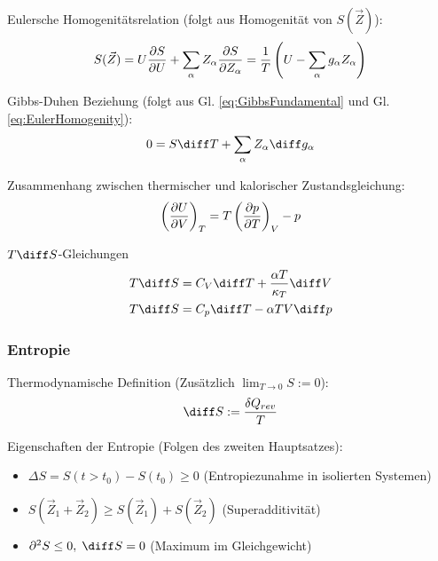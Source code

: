 \documentclass[11pt]{article}
\numberwithin{equation}{section}
\begin{document}
        Eulersche Homogenitätsrelation (folgt aus Homogenität von $S(\vec{Z})$):
        \begin{equation}
          \label{eq:EulerHomogenity}
          S(\vec{Z}) = U\frac{\partial S}{\partial U} + \sum_\alpha Z_\alpha\frac{\partial S}{\partial Z_\alpha}
          = \frac{1}{T} \left( U-\sum_\alpha g_\alpha Z_\alpha \right)
        \end{equation}

        Gibbs-Duhen Beziehung (folgt aus Gl. \ref{eq:GibbsFundamental} und Gl. \ref{eq:EulerHomogenity}):
        \begin{equation}
          0 = S \diff T + \sum_\alpha Z_\alpha \diff g_\alpha
        \end{equation}

        Zusammenhang zwischen thermischer und kalorischer Zustandsgleichung:
        \begin{equation}
          \left(\frac{\partial U}{\partial V}\right)_T = T\left(\frac{\partial p}{\partial T}\right)_V - p
        \end{equation}

        $T \diff S$-Gleichungen
        \begin{equation}
          \begin{aligned}
            T \diff S &= C_V \diff T + \frac{\alpha T}{\kappa_T} \diff V \\
            T \diff S &= C_p \diff T - \alpha T V \diff p
          \end{aligned}
        \end{equation}

      \subsubsection{Entropie}
        Thermodynamische Definition (Zusätzlich $\lim_{T\rightarrow 0} S := 0$):
        \begin{equation}
          \diff S := \frac{\delta Q_{rev}}{T}
        \end{equation}

        Eigenschaften der Entropie (Folgen des zweiten Hauptsatzes):
        \begin{itemize}\itemsep -0pt  %
          \item $\Delta S = S(t>t_0)-S(t_0) \ge 0$ \hfill{(Entropiezunahme in isolierten Systemen)}
          \item $S(\vec{Z}_1 + \vec{Z}_2) \ge S(\vec{Z}_1) + S(\vec{Z}_2)$ \hfill{(Superadditivität)}
          \item $\partial^2 S \le 0,\;\diff S = 0$ \hfill{(Maximum im Gleichgewicht)}
        \end{itemize}
\end{document}
